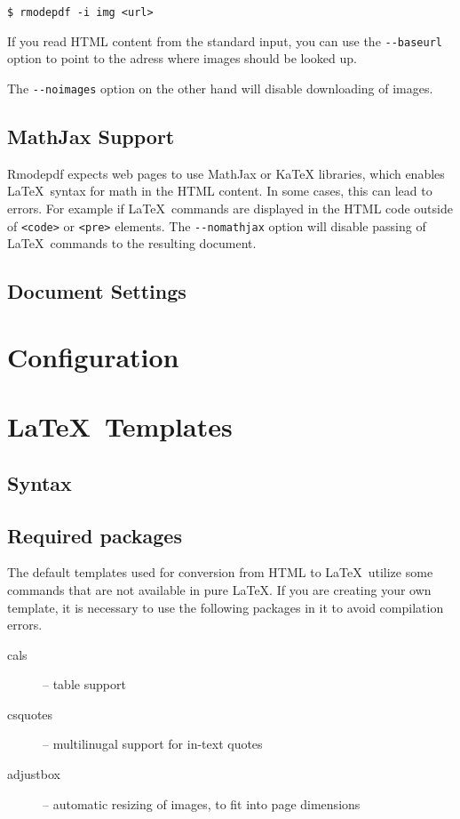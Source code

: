\documentclass{article}
\begin{document}
\begin{verbatim}
$ rmodepdf -i img <url>
\end{verbatim}

If you read HTML content from the standard input, you can use the \verb|--baseurl| option to  
point to the adress where images should be looked up.

The \verb|--noimages| option on the other hand will disable downloading of images.

\subsection{MathJax Support}

Rmodepdf expects web pages to use MathJax or KaTeX libraries, which enables \LaTeX\ syntax for math 
in the HTML content. In some cases, this can lead to errors. For example if  \LaTeX\ commands are 
displayed in the HTML code outside of \verb|<code>| or \verb|<pre>| elements. The \verb|--nomathjax| option
will disable passing of \LaTeX\ commands to the resulting document.


\subsection{Document Settings}

\section{Configuration}

\section{\LaTeX\ Templates}


\subsection{Syntax}


\subsection{Required packages}


The default templates used for conversion from HTML to \LaTeX\ utilize some
commands that are not available in pure \LaTeX. If you are creating your own
template, it is necessary to use the following packages in it to avoid
compilation errors.

\begin{description}
  \item[cals] -- table support
  \item[csquotes] -- multilinugal support for in-text quotes
  \item[adjustbox] -- automatic resizing of images, to fit into page dimensions
\end{description}
\end{document}
